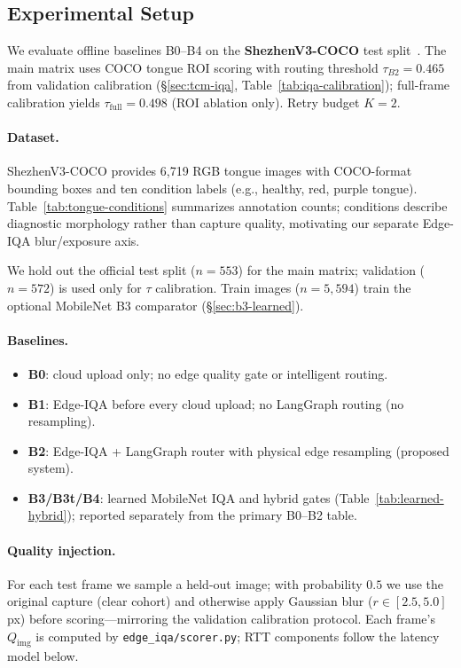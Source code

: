 \subsection{Experimental Setup}
\label{sec:setup}

We evaluate offline baselines B0--B4 on the \textbf{ShezhenV3-COCO} test split~\cite{zhang2020tongue}.
The main matrix uses COCO tongue ROI scoring with routing threshold $\tau_{B2}{=}0.465$ from validation calibration (\S\ref{sec:tcm-iqa}, Table~\ref{tab:iqa-calibration}); full-frame calibration yields $\tau_{\mathrm{full}}{=}0.498$ (ROI ablation only).
Retry budget $K{=}2$.

\paragraph{Dataset.}
ShezhenV3-COCO provides 6{,}719 RGB tongue images with COCO-format bounding boxes and ten condition labels (e.g., healthy, red, purple tongue).
Table~\ref{tab:tongue-conditions} summarizes annotation counts; conditions describe diagnostic morphology rather than capture quality, motivating our separate Edge-IQA blur/exposure axis.

We hold out the official test split ($n{=}553$) for the main matrix; validation ($n{=}572$) is used only for $\tau$ calibration.
Train images ($n{=}5{,}594$) train the optional MobileNet B3 comparator (\S\ref{sec:b3-learned}).

\paragraph{Baselines.}
\begin{itemize}
  \item \textbf{B0}: cloud upload only; no edge quality gate or intelligent routing.
  \item \textbf{B1}: Edge-IQA before every cloud upload; no LangGraph routing (no resampling).
  \item \textbf{B2}: Edge-IQA + LangGraph router with physical edge resampling (proposed system).
  \item \textbf{B3/B3t/B4}: learned MobileNet IQA and hybrid gates (Table~\ref{tab:learned-hybrid}); reported separately from the primary B0--B2 table.
\end{itemize}

\paragraph{Quality injection.}
For each test frame we sample a held-out image; with probability $0.5$ we use the original capture (clear cohort) and otherwise apply Gaussian blur ($r\in[2.5,5.0]$\,px) before scoring---mirroring the validation calibration protocol.
Each frame's $Q_{\mathrm{img}}$ is computed by \texttt{edge\_iqa/scorer.py}; RTT components follow the latency model below.

